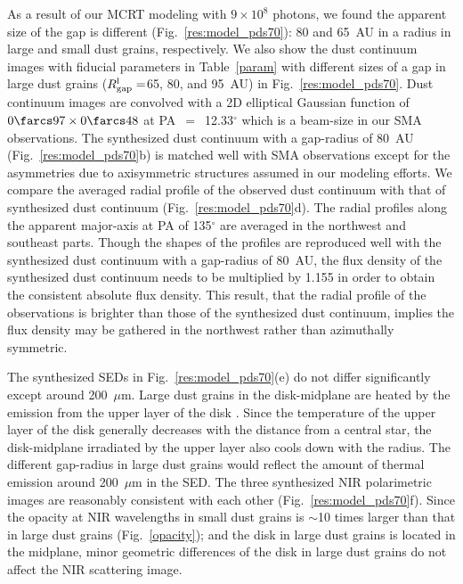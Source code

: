 \documentclass[apj]{emulateapj-rtx4}
\begin{document}
  As a result of our MCRT modeling with $9\times10^{8}$ photons, we found the apparent size of the gap is different 
  (Fig.~\ref{res:model_pds70}): 
  80 and 65~AU in a radius in large and small dust grains, respectively. We also show the dust continuum images with fiducial parameters
  in Table~\ref{param} 
  with different sizes
    of a gap in large dust grains ($R_{\rm gap}^{\rm l} =$65, 80, and 95~AU) 
  in Fig.~\ref{res:model_pds70}. Dust continuum images are convolved with a 2D elliptical Gaussian function of 
  $0\farcs97\times0\farcs48$ at PA~$=$~12.33$^{\circ}$ which is a beam-size in our SMA observations. 
  The synthesized dust continuum with a gap-radius of 80~AU (Fig.~\ref{res:model_pds70}b) is 
  matched well 
  with SMA observations
  except for the asymmetries due to axisymmetric structures assumed in our modeling efforts. 
  We compare the averaged radial profile of the 
  observed dust continuum with that of synthesized dust continuum (Fig.~\ref{res:model_pds70}d). The radial profiles along
  the apparent major-axis at PA of 135$^{\circ}$ are averaged in the northwest and southeast parts. Though the shapes of the profiles 
  are reproduced well
  with the synthesized dust continuum with a gap-radius of 80~AU, the flux density of the synthesized 
  dust continuum needs to be multiplied by 1.155 in order to obtain the consistent absolute flux density. This result, that
  the radial profile of the observations is brighter than those of the synthesized dust continuum, implies the flux density 
  may be gathered in the northwest rather than azimuthally symmetric.

  The synthesized SEDs in Fig.~\ref{res:model_pds70}(e) do not differ significantly except around 200~$\mu$m.
  Large dust grains in the disk-midplane are heated by the emission from the upper layer of the disk \citep[c.f., Fig.~1 in][]{dale06}.
  Since the temperature of the upper layer of the disk generally decreases with the distance 
  from
  a central star,  
  the disk-midplane irradiated by the upper layer also cools down with the radius. The different gap-radius in large dust grains
  would reflect the amount of thermal emission around 200~$\mu$m in the SED. The three synthesized NIR polarimetric images are reasonably
  consistent with each other (Fig.~\ref{res:model_pds70}f). Since the opacity at NIR wavelengths
  in small dust grains is $\sim$10 times larger than that in large dust grains (Fig.~\ref{opacity}); and the disk in large dust grains
  is located in the midplane, minor geometric differences of the disk in large dust grains do not affect the NIR scattering image.
\end{document}
